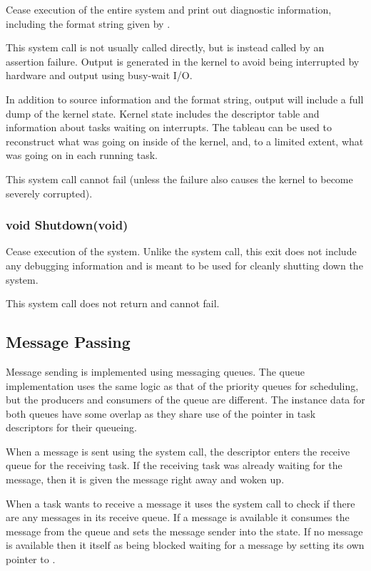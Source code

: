 \documentclass[pdftex,10pt,a4paper]{article}
\begin{document}
Cease execution of the entire system and print out diagnostic
information, including the format string given by .

This system call is not usually called directly, but is instead called
by an assertion failure. Output is generated in the kernel to avoid
being interrupted by hardware and output using busy-wait I/O.

In addition to source information and the format string, output will
include a full dump of the kernel state. Kernel state includes the
descriptor table and information about tasks waiting on
interrupts. The tableau can be used to reconstruct what was going on
inside of the kernel, and, to a limited extent, what was going on in
each running task.

This system call cannot fail (unless the failure also causes the
kernel to become severely corrupted).


\subsubsection*{void Shutdown(void)}

Cease execution of the system. Unlike the  system call,
this exit does not include any debugging information and is meant to
be used for cleanly shutting down the system.

This system call does not return and cannot fail.


\subsection*{Message Passing}

Message sending is implemented using messaging queues. The queue
implementation uses the same logic as that of the priority queues for
scheduling, but the producers and consumers of the queue are
different. The instance data for both queues have some overlap as they
share use of the  pointer in task descriptors for their
queueing.

When a message is sent using the  system call, the
descriptor enters the receive queue for the receiving task. If the
receiving task was already waiting for the message, then it is given
the message right away and woken up.

When a task wants to receive a message it uses the 
system call to check if there are any messages in its receive
queue. If a message is available it consumes the message from the
queue and sets the message sender into the  state.
If no message is available then it itself as being blocked waiting for a
message by setting its own  pointer to .
\end{document}
